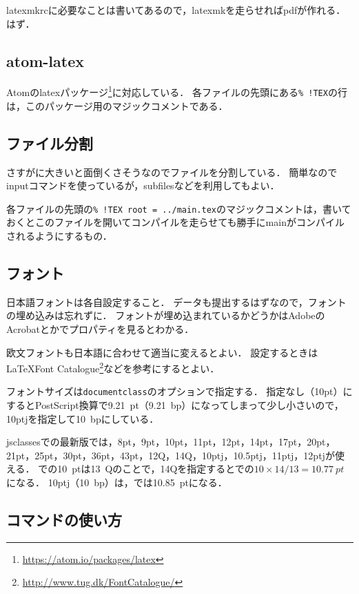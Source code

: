 latexmkrcに必要なことは書いてあるので，latexmkを走らせればpdfが作れる．はず．

\subsection{atom-latex}

Atomのlatexパッケージ\footnote{\url{https://atom.io/packages/latex}}に対応している．
各ファイルの先頭にある\verb|% !TEX|の行は，このパッケージ用のマジックコメントである．

\subsection{ファイル分割}

さすがに大きいと面倒くさそうなのでファイルを分割している．
簡単なのでinputコマンドを使っているが，subfilesなどを利用してもよい．

各ファイルの先頭の\verb|% !TEX root = ../main.tex|のマジックコメントは，書いておくとこのファイルを開いてコンパイルを走らせても勝手にmainがコンパイルされるようにするもの．

\subsection{フォント}
\label{ssec:02-hoge-font}

日本語フォントは各自設定すること．
データも提出するはずなので，フォントの埋め込みは忘れずに．
フォントが埋め込まれているかどうかはAdobeのAcrobatとかでプロパティを見るとわかる．

欧文フォントも日本語に合わせて適当に変えるとよい．
設定するときは\LaTeX Font Catalogue\footnote{\url{http://www.tug.dk/FontCatalogue/}}などを参考にするとよい．

フォントサイズは\verb|documentclass|のオプションで指定する．
指定なし（10pt）にするとPostScript換算で\SI{9.21}{pt}（\SI{9.21}{bp}）になってしまって少し小さいので，10ptjを指定して\SI{10}{bp}にしている．

jsclassesでの最新版では，8pt，9pt，10pt，11pt，12pt，14pt，17pt，20pt，21pt，25pt，30pt，36pt，43pt，12Q，14Q，10ptj，10.5ptj，11ptj，12ptjが使える．
\pLaTeX での\SI{10}{pt}は\SI{13}{Q}のことで，14Qを指定すると\pLaTeX での$10 \times 14/13=\SI{10.77}{pt}$になる．
10ptj（\SI{10}{bp}）は，\pLaTeX では\SI{10.85}{pt}になる．

\subsection{コマンドの使い方}
\label{ssec:02-hoge-commands}

